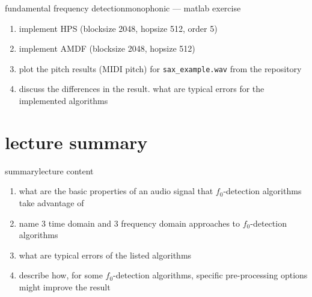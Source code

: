 	\begin{frame}{fundamental frequency detection}{monophonic --- matlab exercise}
        \begin{enumerate}
            \item   implement HPS (blocksize 2048, hopsize 512, order 5)
            \item   implement AMDF  (blocksize 2048, hopsize 512)
            \item   plot the pitch results (MIDI pitch) for \texttt{sax\_example.wav} from the repository
            \item   discuss the differences in the result. what are typical errors for the implemented algorithms 
        \end{enumerate}
	\end{frame}
	

   \section[summary]{lecture summary}
        \begin{frame}{summary}{lecture content}
            \begin{enumerate}
                \item   what are the basic properties of an audio signal that  $f_0$-detection algorithms take advantage of
                \smallskip
                \item<2->   name 3 time domain and 3 frequency domain approaches to $f_0$-detection algorithms
                \smallskip
                \item<3->   what are typical errors of the listed algorithms
                \smallskip
                \item<4->   describe how, for some $f_0$-detection algorithms, specific pre-processing options might improve the result
            \end{enumerate}
        \end{frame}


